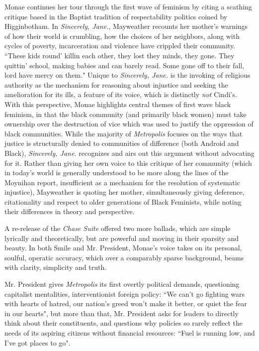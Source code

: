 \documentclass[a4paper, 11pt]{article} %
\begin{document}
Monae continues her tour through the first wave of feminism by citing a scathing critique based in the Baptist tradition of respectability politics coined by Higginbotham\cite{higginbotham}.
In \emph{Sincerely, Jane.}, Mayweather recounts her mother's warnings of how their world is crumbling, how the choices of her neighbors, along with cycles of poverty, incarceration and violence have crippled their community.
``These kids round' killin each other, they lost they minds, they gone. They quittin' school, making babies and can barely read. Some gone off to their fall, lord have mercy on them."\cite{sincerelyjane}
Unique to \emph{Sincerely, Jane.} is the invoking of religious authority as the mechanism for reasoning about injustice and seeking the amelioration for its ills, a feature of its voice, which is distinctly \emph{not} Cindi's.
With this perspective, Monae highlights central themes of first wave black feminism, in that the black community (and primarily black women) must take ownership over the destruction of vice which was used to justify the oppression of black communities. 
While the majority of \emph{Metropolis} focuses on the ways that justice is structurally denied to communities of difference (both Android and Black), \emph{Sincerely, Jane.} recognizes and airs out this argument without advocating for it.
Rather than giving her own voice to this critique of her community (which in today's world is generally understood to be more along the lines of the Moynihan report, insufficient as a mechanism for the resolution of systematic injustice), Mayweather is quoting her mother, simultaneously giving deference, citationality and respect to older generations of Black Feminists, while noting their differences in theory and perspective.

A re-release of the \emph{Chase Suite} offered two more ballads, which are simple lyrically and theoretically, but are powerful and moving in their sparsity and beauty.
In both Smile and Mr. President, Monae's voice takes on its personal, soulful, operatic accuracy, which over a comparably sparse background, beams with clarity, simplicity and truth.

Mr. President gives \emph{Metropolis} its first overtly political demands, questioning capitalist mentalities, interventionist foreign policy: 
``We can't go fighting wars with hearts of hatred, our nation's greed won't make it better, or quiet the fear in our hearts"\cite{mrpresident},
but more than that, Mr. President asks for leaders to directly think about their constituents, and questions why policies so rarely reflect the needs of its aspiring citizens without financial resources:
``Fuel is running low, and I've got places to go"\cite{mrpresident}.
\end{document}
